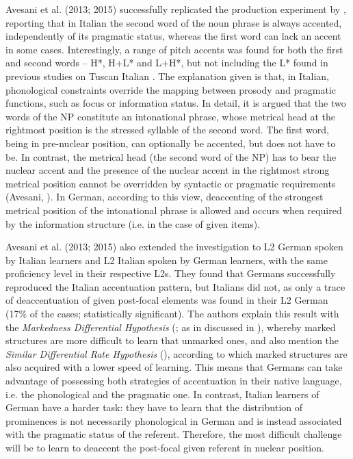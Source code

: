 Avesani et al. (2013; 2015) successfully replicated the production experiment by \citet{SwertsEtAl2002}, reporting that in Italian the second word of the noun phrase is always accented, independently of its pragmatic status, whereas the first word can lack an accent in some cases. Interestingly, a range of pitch accents was found for both the first and second words – H*, H+L* and L+H*, but not including the L* found in previous studies on Tuscan Italian \citep{Bocci2013}. The explanation given is that, in Italian, phonological constraints override the mapping between prosody and pragmatic functions, such as focus or information status. In detail, it is argued that the two words of the NP constitute an intonational phrase, whose metrical head at the rightmost position is the stressed syllable of the second word. The first word, being in pre-nuclear position, can optionally be accented, but does not have to be. In contrast, the metrical head (the second word of the NP) has to bear the nuclear accent and the presence of the nuclear accent in the rightmost strong metrical position cannot be overridden by syntactic or pragmatic requirements (Avesani, \citealt{BocciVayra2015}). In German, according to this view, deaccenting of the strongest metrical position of the intonational phrase is allowed and occurs when required by the information structure (i.e. in the case of given items).

Avesani et al. (2013; 2015) also extended the investigation to L2 German spoken by Italian learners and L2 Italian spoken by German learners, with the same proficiency level in their respective L2s. They found that Germans successfully reproduced the Italian accentuation pattern, but Italians did not, as only a trace of deaccentuation of given post-focal elements was found in their L2 German (17\% of the cases; statistically significant). The authors explain this result with the \textit{Markedness Differential Hypothesis} (\citealt{Eckman1977}; as in \citealt{RasierHiligsmann2007} discussed in ), whereby marked structures are more difficult to learn that unmarked ones, and also mention the \textit{Similar Differential Rate Hypothesis} (\citealt{MajorKim1996}), according to which marked structures are also acquired with a lower speed of learning. This means that Germans can take advantage of possessing both strategies of accentuation in their native language, i.e. the phonological and the pragmatic one. In contrast, Italian learners of German have a harder task: they have to learn that the distribution of prominences is not necessarily phonological in German and is instead associated with the pragmatic status of the referent. Therefore, the most difficult challenge will be to learn to deaccent the post-focal given referent in nuclear position.

